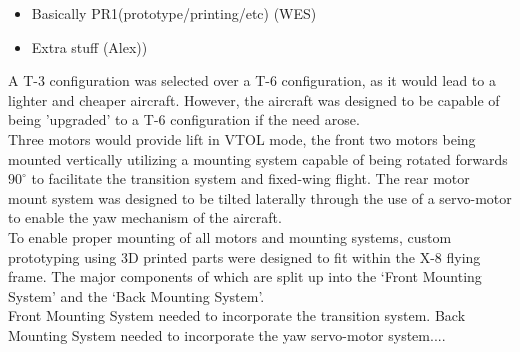 \color{red}
\begin{itemize}
\item Basically PR1(prototype/printing/etc) (WES)
\item Extra stuff (Alex))
\end{itemize}
\color{black}

A T-3 configuration was selected over a T-6 configuration, as it would lead to a lighter and cheaper aircraft. However, the aircraft was designed to be capable of being 'upgraded' to a T-6 configuration if the need arose.\\
Three motors would provide lift in VTOL mode, the front two motors being mounted vertically utilizing a mounting system capable of being rotated forwards $90^{\circ}$ to facilitate the transition system and fixed-wing flight. The rear motor mount system was designed to be tilted laterally through the use of a servo-motor to enable the yaw mechanism of the aircraft.\\
To enable proper mounting of all motors and mounting systems, custom prototyping using 3D printed parts were designed to fit within the X-8 flying frame. The major components of which are split up into the `Front  Mounting System' and the `Back Mounting System'.\\
Front Mounting System needed to incorporate the transition system.
Back Mounting System needed to incorporate the yaw servo-motor system....
